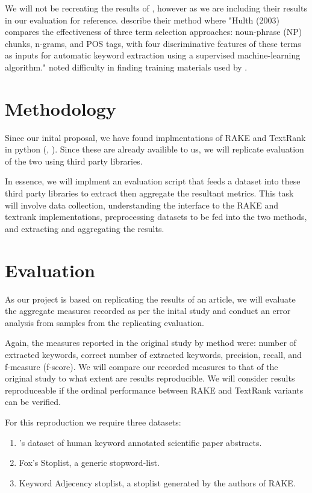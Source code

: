 \documentclass[11pt,a4paper]{article}
\begin{document}
We will not be recreating the results of \citet{hulth-2003-improved}, however as we are including their results in our evaluation for reference. \citet{1} describe their method where "Hulth (2003) compares the effectiveness of three term selection approaches: noun-phrase (NP) chunks, n-grams, and POS tags, with four discriminative features of these terms as inputs for automatic keyword extraction using a supervised machine-learning algorithm." \citet{1} noted difficulty in finding training materials used by \citet{hulth-2003-improved}.    

\section{Methodology}

Since our inital proposal, we have found implmentations of RAKE and TextRank in python (\citet{2}, \citet{3}). Since these are already availible to us, we will replicate  evaluation of the two using third party libraries. 

In essence, we will implment an evaluation script that feeds a dataset into these third party libraries to extract then aggregate the resultant metrics. This task will involve data collection, understanding the interface to the RAKE and textrank implementations, preprocessing datasets to be fed into the two methods, and extracting and aggregating the results.

\section{Evaluation}

As our project is based on replicating the results of an article, we will evaluate the aggregate measures recorded as per the inital study and conduct an error analysis from samples from the replicating evaluation. 

Again, the measures reported in the original study by method were: number of extracted keywords, correct number of extracted keywords, precision, recall, and f-measure (f-score).  We will compare our recorded measures to that of the original study to what extent are  results reproducible. We will consider  results reproduceable if the ordinal performance between RAKE and TextRank variants can be verified. 

For this reproduction we require three datasets:

\begin{enumerate}
\item \citet{hulth-2003-improved}'s dataset of human keyword annotated scientific paper abstracts.
\item Fox's Stoplist, a generic stopword-list. 
\item Keyword Adjecency stoplist, a stoplist generated by the authors of RAKE.
\end{enumerate}   
\end{document}

